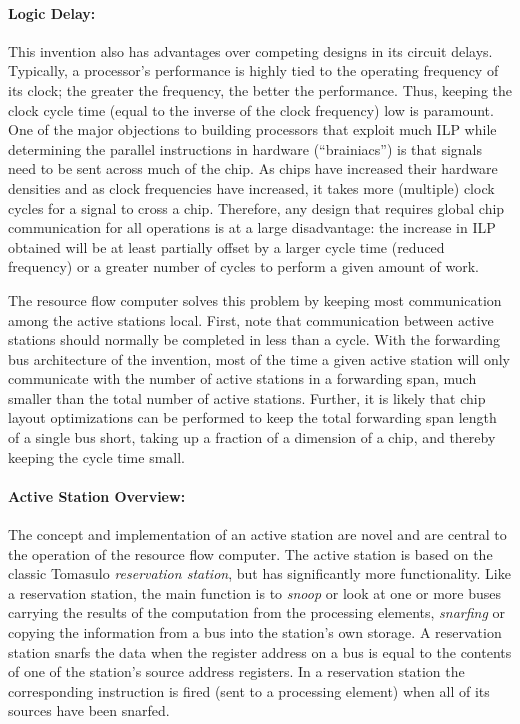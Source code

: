 \documentclass[10pt,dvips]{article}
\begin{document}
\paragraph{Logic Delay: }
This invention also has advantages over competing designs in its circuit
delays. Typically, a processor's performance is highly tied to the
operating frequency of its clock; the greater the frequency, the better
the performance. Thus, keeping the clock cycle time (equal to the inverse
of the clock frequency) low is paramount. One of the major objections to
building processors that exploit much ILP while determining the parallel
instructions in hardware (``brainiacs'') is that signals need to be
sent across much of the chip. As chips have increased their hardware
densities and as clock frequencies have increased, it takes more (multiple)
clock cycles for a signal to cross a chip. Therefore, any design that
requires global chip communication for all operations is at a large
disadvantage: the increase in ILP obtained will be at least partially
offset by a larger cycle time (reduced frequency) or a greater number
of cycles to perform a given amount of work.

The resource flow computer solves this problem by keeping most communication
among the active stations local. First, note that communication between
active stations should normally be completed in less than a cycle.
With the forwarding bus architecture of the invention,
most of the time a given active station will only communicate
with the number of active stations in a forwarding span, much smaller than
the total number of active stations. Further, it is likely that chip
layout optimizations can be performed to keep the total forwarding span
length of a single bus short, taking up a fraction of a dimension of a chip,
and thereby keeping the cycle time small.

\paragraph{Active Station Overview: }
The concept and implementation of an active station are novel and are
central to the operation of the resource flow computer.
The active station is based on the classic Tomasulo {\it reservation
station}\cite{Tomasulo67}, but has significantly more functionality. Like a reservation station,
the main function is to {\it snoop} or look at one or more buses carrying the
results of the computation from the processing elements, {\it snarfing} or
copying the information from a bus into the station's own storage. A reservation
station snarfs the data when the register address on a bus is equal to the contents of
one of the station's source address registers. In a reservation station the
corresponding instruction is fired (sent to a processing element) when all of its
sources have been snarfed.
\end{document}

